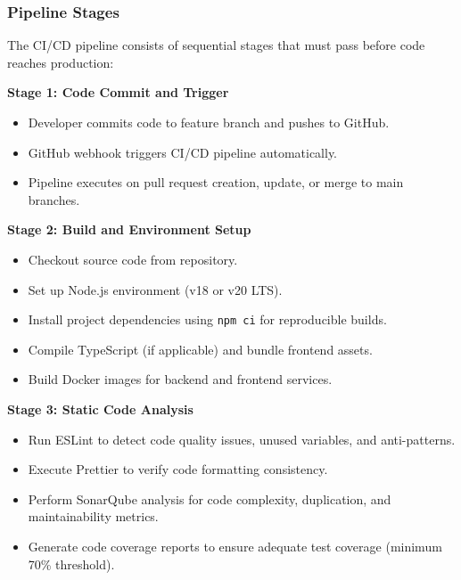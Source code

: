 \documentclass[12pt,a4paper]{article}
\begin{document}
\subsubsection{Pipeline Stages}

The CI/CD pipeline consists of sequential stages that must pass before code reaches production:

\begin{tcolorbox}[colback=lightgray, colframe=secondaryblue, boxrule=0.8pt, arc=3pt, left=10pt, right=10pt, top=8pt, bottom=8pt]

\textbf{Stage 1: Code Commit and Trigger}

\begin{itemize}[leftmargin=2em, itemsep=6pt]
    \item Developer commits code to feature branch and pushes to GitHub.
    \item GitHub webhook triggers CI/CD pipeline automatically.
    \item Pipeline executes on pull request creation, update, or merge to main branches.
\end{itemize}

\vspace{0.5em}

\textbf{Stage 2: Build and Environment Setup}

\begin{itemize}[leftmargin=2em, itemsep=6pt]
    \item Checkout source code from repository.
    \item Set up Node.js environment (v18 or v20 LTS).
    \item Install project dependencies using \texttt{npm ci} for reproducible builds.
    \item Compile TypeScript (if applicable) and bundle frontend assets.
    \item Build Docker images for backend and frontend services.
\end{itemize}

\vspace{0.5em}

\textbf{Stage 3: Static Code Analysis}

\begin{itemize}[leftmargin=2em, itemsep=6pt]
    \item Run ESLint to detect code quality issues, unused variables, and anti-patterns.
    \item Execute Prettier to verify code formatting consistency.
    \item Perform SonarQube analysis for code complexity, duplication, and maintainability metrics.
    \item Generate code coverage reports to ensure adequate test coverage (minimum 70\% threshold).
\end{itemize}


\end{tcolorbox}
\end{document}
